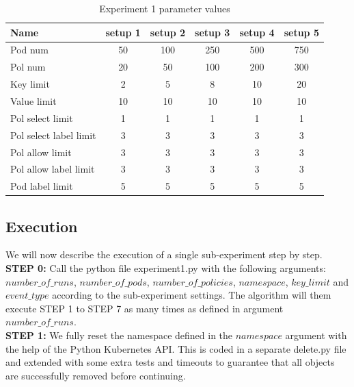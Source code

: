\begin{table}[H]
    \centering
    \begin{tabular}{|l|c|c|c|c|c|}
        \hline
        \textbf{Name} & \textbf{setup 1} & \textbf{setup 2} & \textbf{setup 3} & \textbf{setup 4} & \textbf{setup 5}\\
        \hline
        Pod num & 50 & 100 & 250 & 500 & 750 \\
        Pol num & 20 & 50 & 100 & 200 & 300 \\
        Key limit & 2 & 5 & 8 & 10 & 20 \\
        Value limit & 10 & 10 & 10 & 10 & 10 \\
        Pol select limit & 1 & 1 & 1 & 1 & 1 \\
        Pol select label limit & 3 & 3 & 3 & 3 & 3 \\
        Pol allow limit & 3 & 3 & 3 & 3 & 3 \\
        Pol allow label limit & 3 & 3 & 3 & 3 & 3 \\
        Pod label limit & 5 & 5 & 5 & 5 & 5 \\
        \hline
    \end{tabular}
    \caption{Experiment 1 parameter values}
    \label{tab:exp1pars}
\end{table}

\subsection{Execution} \label{exp1:execution}
 We will now describe the execution of a single sub-experiment step by step.
\\[10pt]

\textbf{STEP 0:} Call the python file experiment1.py with the following arguments: $number\_of\_runs$, $number\_of\_pods$, $number\_of\_policies$, $namespace$, $key\_limit$ and $event\_type$ according to the sub-experiment settings. The algorithm will them execute STEP 1 to STEP 7 as many times as defined in argument $number\_of\_runs$.
\\[10pt]

\textbf{STEP 1:} We fully reset the namespace defined in the $namespace$ argument with the help of the Python Kubernetes API. This is coded in a separate delete.py file and extended with some extra tests and timeouts to guarantee that all objects are successfully removed before continuing.
\\[10pt]

